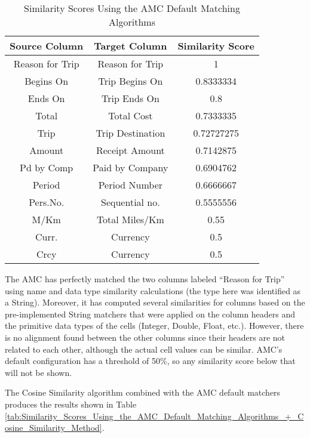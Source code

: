 \begin{table}[ht]
\centering
\begin{tabular}{|c|c|c|} \hline
\textbf{Source Column} & \textbf{Target Column} & \textbf{Similarity Score} \\ \hline
Reason for Trip & Reason for Trip & 1 \\ \hline
Begins On & Trip Begins On & 0.8333334 \\ \hline
Ends On & Trip Ends On & 0.8 \\ \hline
Total & Total Cost & 0.7333335 \\ \hline
Trip & Trip Destination & 0.72727275 \\ \hline
Amount & Receipt Amount & 0.7142875 \\ \hline
Pd by Comp & Paid by Company & 0.6904762 \\ \hline
Period & Period Number & 0.6666667 \\ \hline
Pers.No. & Sequential no. & 0.5555556 \\ \hline
M/Km & Total Miles/Km & 0.55 \\ \hline
Curr. & Currency & 0.5 \\ \hline
Crcy & Currency & 0.5 \\ \hline
\end{tabular}
\caption{Similarity Scores Using the AMC Default Matching Algorithms}
\label{tab:Similarity_Scores_Using_the_AMC_Default_Matching_Algorithms}
\end{table}

The AMC has perfectly matched the two columns labeled ``Reason for Trip'' using name and data type similarity calculations (the type here was identified as a String). Moreover, it has computed several similarities for columns based on the pre-implemented String matchers that were applied on the column headers and the primitive data types of the cells (Integer, Double, Float, etc.). However, there is no alignment found between the other columns since their headers are not related to each other, although the actual cell values can be similar. AMC's default configuration has a threshold of 50\%, so any similarity score below that will not be shown.

The Cosine Similarity algorithm combined with the AMC default matchers produces the results shown in Table \ref{tab:Similarity_Scores_Using_the_AMC_Default_Matching_Algorithms_+_Cosine_Similarity_Method}.

